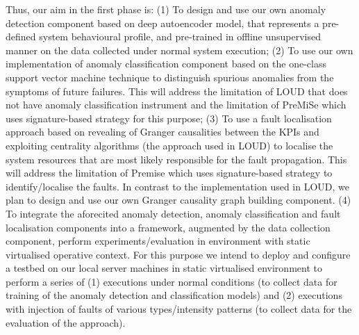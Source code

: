\documentclass[]{usiinfprospectus}
\begin{document}
\begin{enumerate}
%
Thus, our aim in the first phase is: (1) To design and use our own anomaly detection component based on deep autoencoder model, that represents a pre-defined system behavioural profile, and pre-trained in offline unsupervised manner on the data collected under normal system execution; (2) To use our own implementation of anomaly classification component based on the one-class support vector machine technique to distinguish spurious anomalies from the symptoms of future failures. This will address the limitation of LOUD that does not have anomaly classification instrument and the limitation of PreMiSe which uses signature-based strategy for this purpose; (3) To use a fault localisation approach based on revealing of Granger causalities between the KPIs and exploiting centrality algorithms (the approach used in LOUD) to localise the system resources that are most likely responsible for the fault propagation. This will address the limitation of Premise which uses signature-based strategy to identify/localise the faults. In contrast to the implementation used in LOUD, we plan to design and use our own Granger causality graph building component. (4) To integrate the aforecited anomaly detection, anomaly classification and fault localisation components into a framework, augmented by the data collection component, perform experiments/evaluation in environment with static virtualised operative context. For this purpose we intend to deploy and configure a testbed on our local server machines in static virtualised environment to perform a series of (1) executions under normal conditions (to collect data for training of the anomaly detection and classification models) and (2) executions with injection of faults of various types/intensity patterns (to collect data for the evaluation of the approach).
   

\end{enumerate}
\end{document}

